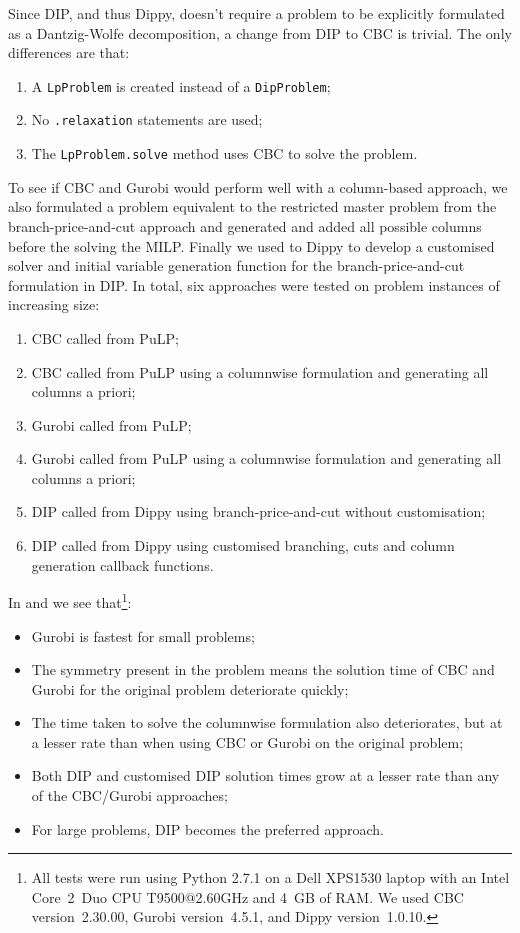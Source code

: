 Since \ac{DIP}, and thus Dippy, doesn't require a problem to be explicitly formulated as a Dantzig-Wolfe decomposition, a change from \ac{DIP} to CBC is trivial.
The only differences are that:
\begin{enumerate}
\item A \lstinline{LpProblem} is created instead of a \lstinline{DipProblem};
\item No \lstinline{.relaxation} statements are used;
\item The \lstinline{LpProblem.solve} method uses CBC to solve the problem.
\end{enumerate}
To see if CBC and Gurobi would perform well with a column-based approach, we also formulated a problem equivalent to the restricted master problem from the branch-price-and-cut approach and generated and added all possible columns before the solving the \ac{MILP}.
Finally we used to Dippy to develop a customised solver and initial variable generation function for the branch-price-and-cut formulation in \ac{DIP}.
In total, six approaches were tested on problem instances of increasing size:
\begin{enumerate}
\item CBC called from PuLP;
\item CBC called from PuLP using a columnwise formulation and generating all columns a priori;
\item Gurobi called from PuLP;
\item Gurobi called from PuLP using a columnwise formulation and generating all columns a priori;
\item \ac{DIP} called from Dippy using branch-price-and-cut without customisation;
\item \ac{DIP} called from Dippy using customised branching, cuts and column generation callback functions.
\end{enumerate}

In  and  we see that\footnote{All tests were run using Python 2.7.1 on a Dell XPS1530 laptop with an Intel Core~2~Duo CPU T9500@2.60GHz and 4~GB of RAM. We used CBC version~2.30.00, Gurobi version~4.5.1, and Dippy version~1.0.10.}:
\begin{itemize}
\item Gurobi is fastest for small problems;
\item The symmetry present in the problem means the solution time of CBC and Gurobi for the original problem deteriorate quickly;
\item The time taken to solve the columnwise formulation also deteriorates, but at a lesser rate than when using CBC or Gurobi on the original problem;
\item Both \ac{DIP} and customised \ac{DIP} solution times grow at a lesser rate than any of the CBC/Gurobi approaches;
\item For large problems, \ac{DIP} becomes the preferred approach.
\end{itemize}


